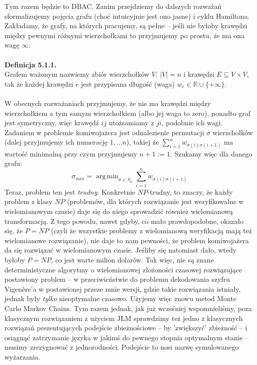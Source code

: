 \documentclass[a4paper]{article}
\DeclareMathOperator*{\argmin}{arg\,min}
\theoremstyle{defn}
\theoremstyle{theorem}
\theoremstyle{lemma}
\theoremstyle{cor}
\theoremstyle{fact}
\begin{document}
Tym razem będzie to DBAC. Zanim przejdziemy do dalszych rozważań sformalizujemy pojęcia grafu (choć intuicyjnie jest ono jasne) i cyklu Hamiltona. Zakładamy, że grafy, na których pracujemy, są pełne – jeśli nie byłoby krawędzi między pewnymi różnymi wierzchołkami to przyjmujemy po prostu, że ma ona wagę $\infty$.\\
\\
\textbf{Definicja 5.1.1.}\\
Grafem ważonym nazwiemy zbiór wierzchołków $V$, $|V| = n$ i krawędzi $E \subseteq V \times V$, tak że każdej krawędzi $e$ jest przypisana długość (waga) $w_e \in \mathbb{R} \cup \{+\infty\}$. \\
\\
W obecnych rozważaniach przyjmujemy, że nie ma krawędzi między wierzchołkiem a tym samym wierzchołkiem (albo jej waga to zero), ponadto graf jest symetryczny, więc krawędź $ij$ utożsamiamy z $ji$, podobnie ich wagi. Zadaniem w problemie komiwojażera jest odnalezienie permutacji $\sigma$ wierzchołków (dalej przyjmujemy ich numerację $1,...n$), takiej że $\sum\limits_{i = 1}^n w_{\sigma(i)\sigma(i+1)}$ ma wartość minimalną przy czym przyjmujemy $n+1 := 1$. Szukamy więc dla danego grafu:
$$ \sigma_{min} = \argmin_{\sigma \in S_n} \sum\limits_{i=1}^n w_{\sigma(i)\sigma(i+1)}$$
Teraz, problem ten jest \textit{trudny}. Konkretnie $NP$-trudny, to znaczy, że każdy problem z klasy $NP$ (problemów, dla których rozwiązanie jest weryfikowalne w wielomianowym czasie) daje się do niego sprowadzić również wielomianową transformacją. Z tego powodu, nawet gdyby, co mało prawdopodobne, okazało się, że $P=NP$ (czyli że wszystkie problemy z wielomianową weryfikacją mają też wielomianowe rozwiązanie), nie daje to nam pewności, że problem komiwojażera da się rozwiązać w wielomianowym czasie. Jeśliby się natomiast dało, wtedy byłoby $P=NP$, co jest warte milion dolarów. Tak więc, nie są znane deterministyczne algorytmy o wielomianowej złożoności czasowej rozwiązujące postawiony problem – w przeciwieństwie do problemu dekodowania szyfru Vigenère'a w postawionej przeze mnie wersji, gdzie takie rozwiązania istniały, jednak były \textit{tylko} nieoptymalne czasowo. Użyjemy więc znowu metod Monte Carlo Markov Chains. Tym razem jednak, jak już wcześniej wspomnieliśmy, poza klasycznym rozwiązaniem z użyciem JŁM sprawdzimy też jedno z klasycznych rozwiązań prezentujących podejście zbieżnościowe – by 'zwiększyć' zbieżność – i osiągnąć zatrzymanie języka w jakimś do pewnego stopnia optymalnym stanie – musimy zrezygnować z jednorodności. Podejście to nosi nazwę symulowanego wyżarzania.
\end{document}
